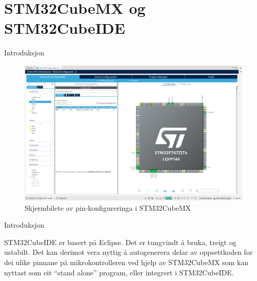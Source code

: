 \section{STM32CubeMX og STM32CubeIDE}

\begin{frame}{Introduksjon}
	
\begin{figure}
	\centering
	\includegraphics[width=0.9\linewidth]{img/stm32cubemx}
	\caption{Skjermbilete av pin-konfigureringa i STM32CubeMX}
	\label{fig:stm32cubemx}
\end{figure}

	
	
\end{frame}


\begin{frame}{Introduksjon}
	
	STM32CubeIDE er basert på Eclipse. Det er tungvindt å bruka, treigt og ustabilt. Det kan derimot vera nyttig å autogenerera delar av oppsettkoden for dei ulike pinnane på mikrokontrolleren ved hjelp av STM32CubeMX som kan nyttast som eit ``stand alone'' program, eller integrert i STM32CubeIDE.
	
	
\end{frame}
